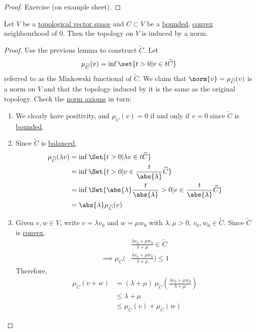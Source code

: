 \documentclass{article}
\begin{document}
\begin{proof}
    Exercise (on example sheet).
\end{proof}

\begin{prop}
    Let $V$ be a \hyperlink{def:topologicalVectorSpace}{topological vector space} and $C \subset V$ be a \hyperlink{def:boundedSubs}{bounded}, \hyperlink{def:convexSubs}{convex} neighbourhood of $0$. Then the topology on $V$ is induced by a norm.
\end{prop}

\begin{proof}
    Use the previous lemma to construct $\widetilde C$. Let
    \begin{equation*}
        \mu_{\widetilde C}(v) = \inf\set{t > 0 | v \in t \widetilde C}
    \end{equation*}
    referred to as the Minkowski functional of $\widetilde C$.
    We claim that $\norm{v} = \mu_{\widetilde C}(v)$ is a norm on $V$ and that the topology induced by it is the same as the original topology.
    Check the \hyperlink{def:normedVectorSpace}{norm axioms} in turn:
    \begin{enumerate}[label=\roman*.]
        \item We clearly have positivity, and $\mu_{\widetilde C}(v) = 0$ if and only if $v = 0$ since $\widetilde C$ is \hyperlink{def:boundedSubs}{bounded}.
        \item Since $\widetilde C$ is \hyperlink{def:balancedSubs}{balanced},
            \begin{align*}
                \mu_{\widetilde C} (\lambda v) &= \inf\Set{t > 0 | \lambda v \in t \widetilde C} \\
                &= \inf\Set{t > 0 | v \in \frac{t}{\abs{\lambda}} \widetilde C} \\
                &= \inf\Set{\abs{\lambda} \frac{t}{\abs{\lambda}} > 0 | v \in \frac{t}{\abs{\lambda}} \widetilde C} \\
                &= \abs{\lambda} \mu_{\widetilde C}(v)
            \end{align*}
        \item Given $v, w \in V$, write $v = \lambda v_0$ and $w = \mu w_0$ with $\lambda, \mu > 0$, $v_0, w_0 \in \widetilde C$.
            Since $\widetilde C$ is \hyperlink{def:convexSubs}{convex},
            \begin{align*}
                &\frac{\lambda v_0 + \mu w_0}{\lambda + \mu} \in \widetilde C \\
                \implies \mu_{\widetilde C} \bigg(&\frac{\lambda v_0 + \mu w_0}{\lambda + \mu}\bigg) \leq 1
            \end{align*}
            Therefore,
            \begin{align*}
                \mu_{\widetilde C} (v + w) &= (\lambda + \mu) \ \mu_{\widetilde C} \left(\frac{\lambda v_0 + \mu w_0}{\lambda + \mu}\right) \\
                &\leq \lambda + \mu \\
                &\leq \mu_{\widetilde C}(v) + \mu_{\widetilde C}(w)
            \end{align*}
    \end{enumerate}
\end{proof}
\end{document}
